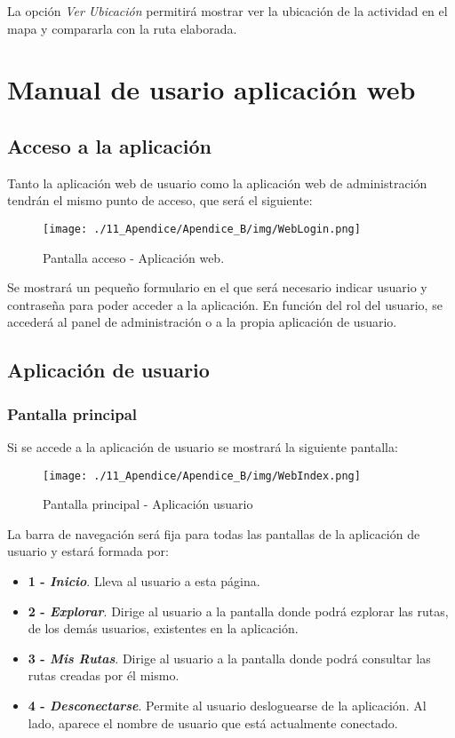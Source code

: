 La opción \textit{Ver Ubicación} permitirá mostrar ver la ubicación de la actividad en el mapa y compararla con la ruta elaborada.


\newpage
\section{Manual de usario aplicación web}

\subsection{Acceso a la aplicación}

Tanto la aplicación web de usuario como la aplicación web de administración tendrán el mismo punto de acceso, que será el siguiente:

\begin{figure}[H]
\centering
\texttt{[image: ./11\_Apendice/Apendice\_B/img/WebLogin.png]}
\caption{Pantalla acceso - Aplicación web.}
\end{figure}

Se mostrará un pequeño formulario en el que será necesario indicar usuario y contraseña para poder acceder a la aplicación. En función del rol del usuario, se accederá al panel de administración o a la propia aplicación de usuario. 

\subsection{Aplicación de usuario}

\subsubsection*{Pantalla principal}
Si se accede a la aplicación de usuario se mostrará la siguiente pantalla:

\begin{figure}[H]
\centering
\texttt{[image: ./11\_Apendice/Apendice\_B/img/WebIndex.png]}
\caption{Pantalla principal - Aplicación usuario}
\end{figure}

La barra de navegación será fija para todas las pantallas de la aplicación de usuario y estará formada por:

\begin{itemize}
	\item \textbf{1 - \textit{Inicio}}. Lleva al usuario a esta página.
	\item \textbf{2 - \textit{Explorar}}. Dirige al usuario a la pantalla donde podrá ezplorar las rutas, de los demás usuarios, existentes en la aplicación.
	\item \textbf{3 - \textit{Mis Rutas}}. Dirige al usuario a la pantalla donde podrá consultar las rutas creadas por él mismo.
	\item \textbf{4 - \textit{Desconectarse}}. Permite al usuario desloguearse de la aplicación. Al lado, aparece el nombre de usuario que está actualmente conectado.
\end{itemize}
	
